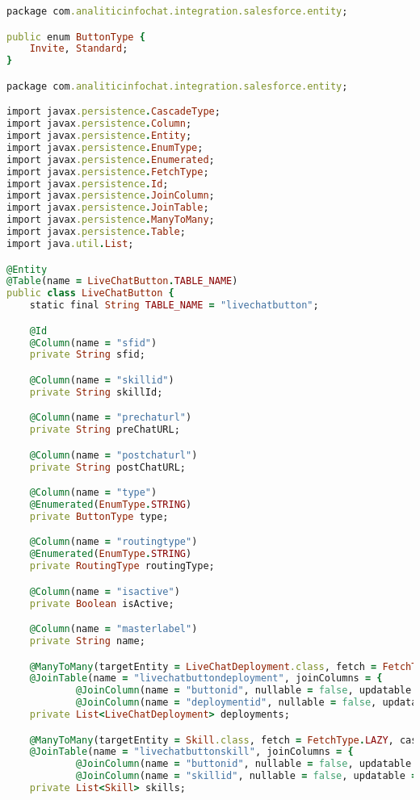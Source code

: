 \begin{lstlisting}[language=Ruby, style=rubystyle]
package com.analiticinfochat.integration.salesforce.entity;

public enum ButtonType {
    Invite, Standard;
}

package com.analiticinfochat.integration.salesforce.entity;

import javax.persistence.CascadeType;
import javax.persistence.Column;
import javax.persistence.Entity;
import javax.persistence.EnumType;
import javax.persistence.Enumerated;
import javax.persistence.FetchType;
import javax.persistence.Id;
import javax.persistence.JoinColumn;
import javax.persistence.JoinTable;
import javax.persistence.ManyToMany;
import javax.persistence.Table;
import java.util.List;

@Entity
@Table(name = LiveChatButton.TABLE_NAME)
public class LiveChatButton {
    static final String TABLE_NAME = "livechatbutton";

    @Id
    @Column(name = "sfid")
    private String sfid;

    @Column(name = "skillid")
    private String skillId;

    @Column(name = "prechaturl")
    private String preChatURL;

    @Column(name = "postchaturl")
    private String postChatURL;

    @Column(name = "type")
    @Enumerated(EnumType.STRING)
    private ButtonType type;

    @Column(name = "routingtype")
    @Enumerated(EnumType.STRING)
    private RoutingType routingType;

    @Column(name = "isactive")
    private Boolean isActive;

    @Column(name = "masterlabel")
    private String name;

    @ManyToMany(targetEntity = LiveChatDeployment.class, fetch = FetchType.LAZY, cascade = CascadeType.ALL)
    @JoinTable(name = "livechatbuttondeployment", joinColumns = {
            @JoinColumn(name = "buttonid", nullable = false, updatable = false) }, inverseJoinColumns = {
            @JoinColumn(name = "deploymentid", nullable = false, updatable = false) })
    private List<LiveChatDeployment> deployments;

    @ManyToMany(targetEntity = Skill.class, fetch = FetchType.LAZY, cascade = CascadeType.ALL)
    @JoinTable(name = "livechatbuttonskill", joinColumns = {
            @JoinColumn(name = "buttonid", nullable = false, updatable = false) }, inverseJoinColumns = {
            @JoinColumn(name = "skillid", nullable = false, updatable = false) })
    private List<Skill> skills;


\end{lstlisting}
